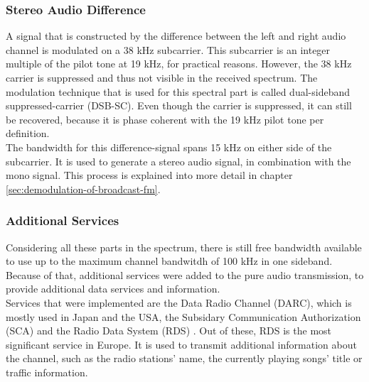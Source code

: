 \subsubsection{Stereo Audio Difference}

A signal that is constructed by the difference between the left and right audio channel is modulated on a 38 kHz subcarrier.
This subcarrier is an integer multiple of the pilot tone at 19 kHz, for practical reasons.
However, the 38 kHz carrier is suppressed and thus not visible in the received spectrum.
The modulation technique that is used for this spectral part is called dual-sideband suppressed-carrier (DSB-SC).
Even though the carrier is suppressed, it can still be recovered, because it is phase coherent with the 19 kHz pilot tone per definition.\\

The bandwidth for this difference-signal spans 15 kHz on either side of the subcarrier.
It is used to generate a stereo audio signal, in combination with the mono signal.
This process is explained into more detail in chapter \ref{sec:demodulation-of-broadcast-fm}.

\subsubsection{Additional Services}

Considering all these parts in the spectrum, there is still free bandwidth available to use up to the maximum channel bandwitdh of 100 kHz in one sideband.
Because of that, additional services were added to the pure audio transmission, to provide additional data services and information.\\

Services that were implemented are the Data Radio Channel (DARC), which is mostly used in Japan and the USA, the Subsidary Communication Authorization (SCA) and the Radio Data System (RDS) \cite{RohdeSchwarzFM}.
Out of these, RDS is the most significant service in Europe.
It is used to transmit additional information about the channel, such as the radio stations' name, the currently playing songs' title or traffic information.



